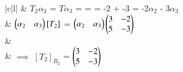 \documentclass[journal,12pt]{IEEEtran}
\begin{document}
\begin{longtable}{|c|l|}
	& $T_2\alpha_3$ = $T\alpha_3$ =   =  = -2  + -3  = -2$\alpha_2$ - 3$\alpha_3$\\
	& $\begin{pmatrix}\alpha_2 & \alpha_3\end{pmatrix}[T_2]$ =  $\begin{pmatrix}\alpha_2 & \alpha_3\end{pmatrix}$$\begin{pmatrix}3&-2\\5&-3\end{pmatrix}$\\
	&\\
	& $\implies$ $[T_2]_{B_2}$ = $\begin{pmatrix}3&-2\\5&-3\end{pmatrix}$\\
	\hline
	\caption{Finding of Basis and corresponding matrix}
    \label{table:2}
\end{longtable}
\end{document}
